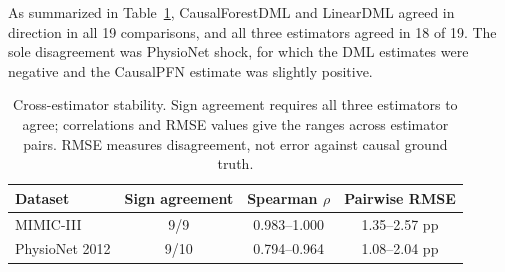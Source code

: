 \documentclass[letterpaper]{article}
\begin{document}
As summarized in Table~\ref{tab:estimator-agreement},
CausalForestDML and LinearDML agreed in direction in all 19 comparisons, and
all three estimators agreed in 18 of 19. The sole disagreement was PhysioNet
shock, for which the DML estimates were negative and the CausalPFN estimate was
slightly positive.

\begin{table}[t]
  \centering
  \small
  \setlength{\tabcolsep}{4pt}
  \begin{tabular}{@{}lccc@{}}
    \toprule
    Dataset &
    Sign agreement &
    Spearman \(\rho\) &
    Pairwise RMSE \\
    \midrule
    MIMIC-III &
    9/9 &
    0.983--1.000 &
    1.35--2.57 pp \\
    PhysioNet 2012 &
    9/10 &
    0.794--0.964 &
    1.08--2.04 pp \\
    \bottomrule
  \end{tabular}
  \caption{Cross-estimator stability. Sign agreement requires all three
  estimators to agree; correlations and RMSE values give the ranges across
  estimator pairs. RMSE measures disagreement, not error against causal ground
  truth.}
  \label{tab:estimator-agreement}
\end{table}




\end{document}
